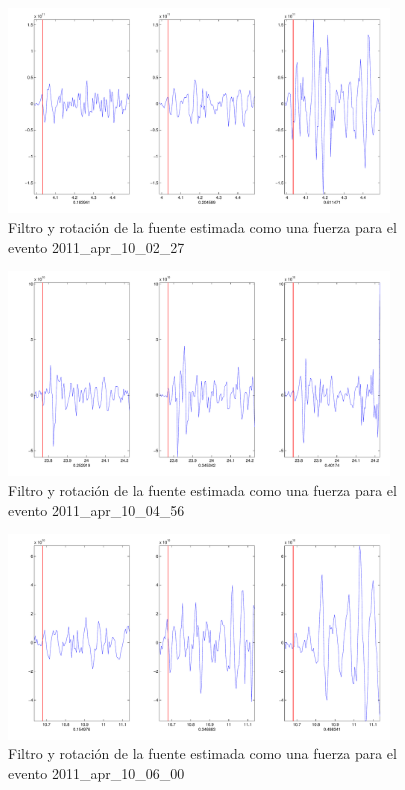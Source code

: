 \begin{figure}[H]
\includegraphics[width=0.9\textwidth,height=0.4\textheight]{linea_timerev/figuras/plotSrcEv25filtrotsrc.pdf}
\caption{Filtro y rotación de la fuente estimada como una fuerza para el
evento 2011\_apr\_10\_02\_27}
\end{figure}
\begin{figure}[H]
\includegraphics[width=0.9\textwidth,height=0.4\textheight]{linea_timerev/figuras/plotSrcEv26filtrotsrc.pdf}
\caption{Filtro y rotación de la fuente estimada como una fuerza para el
evento 2011\_apr\_10\_04\_56}
\end{figure}
\begin{figure}[H]
\includegraphics[width=0.9\textwidth,height=0.4\textheight]{linea_timerev/figuras/plotSrcEv27filtrotsrc.pdf}
\caption{Filtro y rotación de la fuente estimada como una fuerza para el
evento 2011\_apr\_10\_06\_00}
\end{figure}
